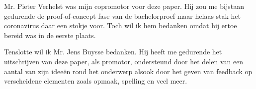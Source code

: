 Mr. Pieter Verhelst was mijn copromotor voor deze paper. Hij zou me bijstaan gedurende de proof-of-concept fase van de bachelorproef maar helaas stak het coronavirus daar een stokje voor. Toch wil ik hem bedanken omdat hij ertoe bereid was in de eerste plaats.

Tenslotte wil ik Mr. Jens Buysse bedanken. Hij heeft me gedurende het uitschrijven van deze paper, als promotor, ondersteund door het delen van een aantal van zijn ideeën rond het onderwerp alsook door het geven van feedback op verscheidene elementen zoals opmaak, spelling en veel meer.


